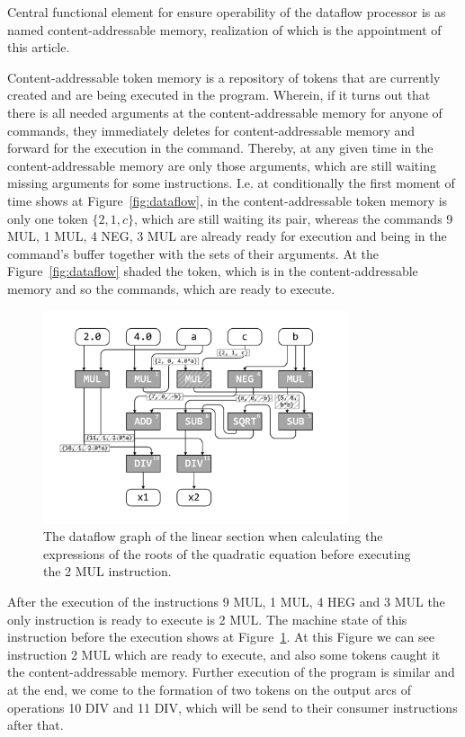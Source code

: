 \documentclass[
11pt,%
tightenlines,%
twoside,%
onecolumn,%
nofloats,%
nobibnotes,%
nofootinbib,%
superscriptaddress,%
noshowpacs,%
centertags]%
{revtex4}
\begin{document}
Central functional element for ensure operability of the dataflow processor is as named content-addressable memory, realization of which is the appointment of this article.

Content-addressable token memory is a repository of tokens that are currently created and are being executed in the program. Wherein, if it turns out that there is all needed arguments at the content-addressable memory for anyone of commands, they immediately deletes for content-addressable memory and forward for the execution in the command. Thereby, at any given time in the content-addressable memory are only those arguments, which are still waiting missing arguments for some instructions. I.e. at conditionally the first moment of time shows at Figure~\ref{fig:dataflow}, in the content-addressable token memory is only one token $\{2, 1, c\}$, which are still waiting its pair, whereas the commands 9 MUL, 1 MUL, 4 NEG, 3 MUL are already ready for execution and being in the command’s buffer together with the sets of their arguments. At the Figure~\ref{fig:dataflow} shaded the token, which is in the content-addressable memory and so the commands, which are ready to execute.

\begin{figure}[h]
\setcaptionmargin{5mm}
\onelinecaptionsfalse %
\includegraphics[width=0.80\textwidth]{pics/dataflow2.pdf}
\caption{The dataflow graph of the linear section when calculating the expressions of the roots of the quadratic equation before executing the 2 MUL instruction.}\label{fig:dataflow2}
\end{figure}

After the execution of the instructions 9 MUL, 1 MUL, 4 HEG and 3 MUL the only instruction is ready to execute is 2 MUL. The machine state of this instruction before the execution shows at Figure~\ref{fig:dataflow2}.
At this Figure we can see instruction 2 MUL which are ready to execute, and also some tokens caught it the content-addressable memory. Further execution of the program is similar and at the end, we come to the formation of two tokens on the output arcs of operations 10 DIV and 11 DIV, which will be send to their consumer instructions after that.
\end{document}
